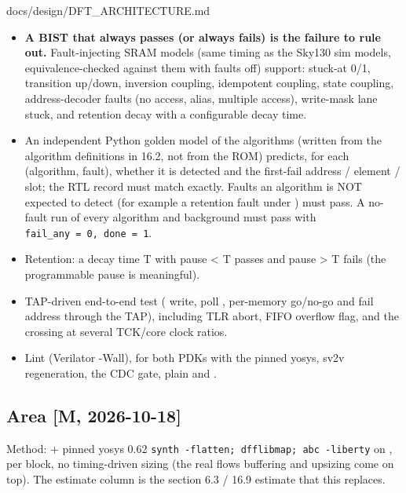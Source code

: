 \begin{relocated}{docs/design/DFT_ARCHITECTURE.md}
\begin{itemize}
\tightlist
\item
  \textbf{A BIST that always passes (or always fails) is the failure to
  rule out.} Fault-injecting SRAM models (same timing as the Sky130 sim
  models, equivalence-checked against them with faults off) support:
  stuck-at 0/1, transition up/down, inversion coupling, idempotent
  coupling, state coupling, address-decoder faults (no access, alias,
  multiple access), write-mask lane stuck, and retention decay with a
  configurable decay time.
\item
  An independent Python golden model of the algorithms (written from the
  algorithm definitions in 16.2, not from the ROM) predicts, for each
  (algorithm, fault), whether it is detected and the first-fail address
  / element / slot; the RTL record must match exactly. Faults an
  algorithm is NOT expected to detect (for example a retention fault
  under ) must pass. A no-fault run of every algorithm
  and background must pass with
  \texttt{fail\_\allowbreak{}any\ =\allowbreak{}\ 0,\allowbreak{}\ done\ =\allowbreak{}\ 1}.
\item
  Retention: a decay time T with pause \textless{} T passes and pause
  \textgreater{} T fails (the programmable pause is meaningful).
\item
  TAP-driven end-to-end test ( write, poll
  , per-memory go/no-go and fail address through the
  TAP), including TLR abort, FIFO overflow flag, and the crossing at
  several TCK/core clock ratios.
\item
  Lint (Verilator -Wall),  for both PDKs with the
  pinned yosys, sv2v regeneration, the CDC gate,  plain
  and .
\end{itemize}

\subsection{Area {[}M, 2026-10-18{]}}\label{tm:ch:dft-architecture:169-area-m-2026-10-18}

Method:  + pinned yosys 0.62
\texttt{synth\ -\allowbreak{}flatten;\ dfflibmap;\ abc\ -\allowbreak{}liberty}
on , per block, no timing-driven
sizing (the real flow\textquotesingle s buffering and 
upsizing come on top). The estimate column is the section 6.3 / 16.9
estimate that this replaces.


\end{relocated}
